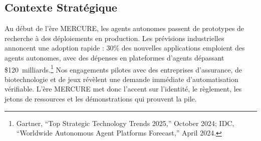 \documentclass[11pt]{article}
\begin{document}
\subsection{Contexte Stratégique}
Au début de l'ère MERCURE, les agents autonomes passent de prototypes de recherche à des déploiements en production. Les prévisions industrielles annoncent une adoption rapide : 30\% des nouvelles applications emploient des agents autonomes, avec des dépenses en plateformes d'agents dépassant \$120~milliards.\footnote{Gartner, ``Top Strategic Technology Trends 2025,'' October 2024; IDC, ``Worldwide Autonomous Agent Platforms Forecast,'' April 2024.} Nos engagements pilotes avec des entreprises d'assurance, de biotechnologie et de jeux révèlent une demande immédiate d'automatisation vérifiable. L'ère MERCURE met donc l'accent sur l'identité, le règlement, les jetons de ressources et les démonstrations qui prouvent la pile.
\end{document}
